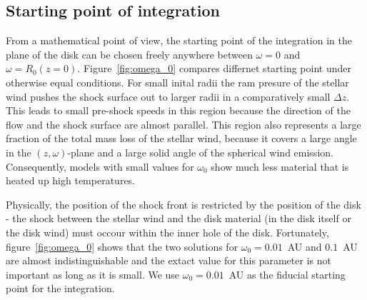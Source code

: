 \subsection{Starting point of integration}
From a mathematical point of view, the starting point of the integration in the plane of the disk can be chosen freely anywhere between $\omega=0$ and $\omega=R_0(z=0)$. Figure~\ref{fig:omega_0} compares differnet starting point under otherwise equal conditions. For small inital radii the ram presure of the stellar wind pushes the shock surface out to larger radii in a comparatively small $\Delta z$. This leads to small pre-shock speeds in this region because the direction of the flow and the shock surface are almost parallel. This region also represents a large fraction of the total mass loss of the stellar wind, because it covers a large angle in the $(z,\omega)$-plane and a large solid angle of the spherical wind emission. Consequently, models with small values for $\omega_0$ show much less material that is heated up high temperatures. 

Physically, the position of the shock front is restricted by the position of the disk - the shock between the stellar wind and the disk material (in the disk itself or the disk wind) must occour within the inner hole of the disk. Fortunately, figure~\ref{fig:omega_0} shows that the two solutions for $\omega_0=0.01$~AU and $0.1$~AU are almost indistinguishable and the extact value for this parameter is not important as long as it is small. We use $\omega_0 = 0.01$~AU as the fiducial starting point for the integration.